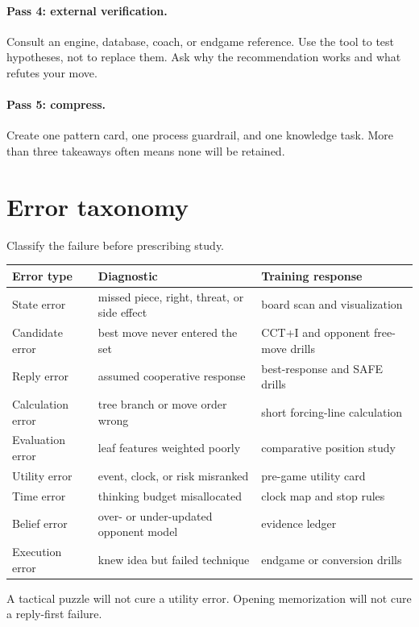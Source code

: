 \paragraph{Pass 4: external verification.} Consult an engine, database, coach, or endgame reference. Use the tool to test hypotheses, not to replace them. Ask why the recommendation works and what refutes your move.

\paragraph{Pass 5: compress.} Create one pattern card, one process guardrail, and one knowledge task. More than three takeaways often means none will be retained.

\section{Error taxonomy}
Classify the failure before prescribing study.

\begin{center}
\begin{tabularx}{.95\textwidth}{p{}YY}
\toprule
\textbf{Error type} & \textbf{Diagnostic} & \textbf{Training response}\\
\midrule
State error & missed piece, right, threat, or side effect & board scan and visualization\\
Candidate error & best move never entered the set & CCT+I and opponent free-move drills\\
Reply error & assumed cooperative response & best-response and SAFE drills\\
Calculation error & tree branch or move order wrong & short forcing-line calculation\\
Evaluation error & leaf features weighted poorly & comparative position study\\
Utility error & event, clock, or risk misranked & pre-game utility card\\
Time error & thinking budget misallocated & clock map and stop rules\\
Belief error & over- or under-updated opponent model & evidence ledger\\
Execution error & knew idea but failed technique & endgame or conversion drills\\
\bottomrule
\end{tabularx}
\end{center}

A tactical puzzle will not cure a utility error. Opening memorization will not cure a reply-first failure.

